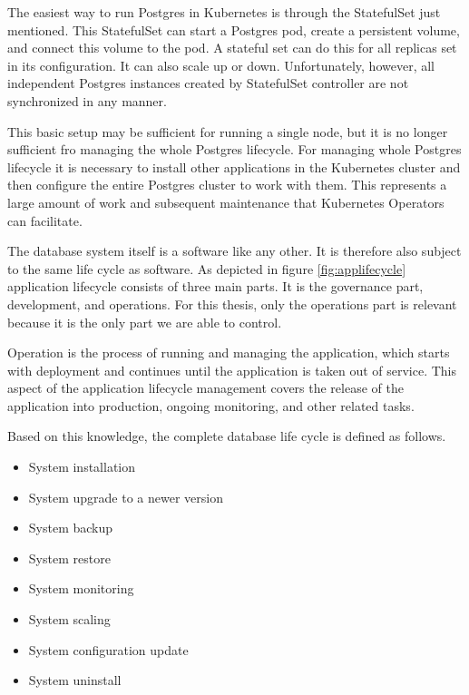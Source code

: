 The easiest way to run Postgres in Kubernetes is through the StatefulSet just mentioned. This StatefulSet can start a Postgres pod, create a persistent volume, and connect this volume to the pod. A stateful set can do this for all replicas set in its configuration. It can also scale up or down. Unfortunately, however, all independent Postgres instances created by StatefulSet controller are not synchronized in any manner.

This basic setup may be sufficient for running a single node, but it is no longer sufficient fro managing the whole Postgres lifecycle. For managing whole Postgres lifecycle it is necessary to install other applications in the Kubernetes cluster and then configure the entire Postgres cluster to work with them. This represents a large amount of work and subsequent maintenance that Kubernetes Operators can facilitate.

The database system itself is a software like any other. It is therefore also subject to the same life cycle as software.
As depicted in figure \ref{fig:applifecycle} application lifecycle consists of three main parts. It is the governance part, development, and operations. For this thesis, only the operations part is relevant because it is the only part we are able to control.

Operation is the process of running and managing the application, which starts with deployment and continues until the application is taken out of service. This aspect of the application lifecycle management covers the release of the application into production, ongoing monitoring, and other related tasks. \cite{ALM}

Based on this knowledge, the complete database life cycle is defined as follows.
\begin{itemize}
  \item System installation
  \item System upgrade to a newer version
  \item System backup
  \item System restore
  \item System monitoring
  \item System scaling
  \item System configuration update
  \item System uninstall
\end{itemize}

